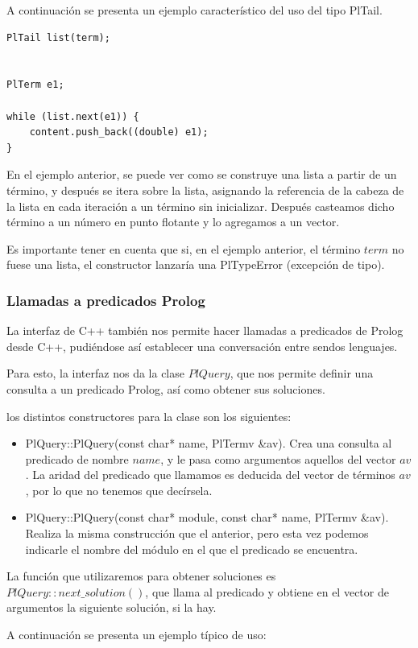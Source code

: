 \documentclass[a4paper]{article}
\begin{document}
A continuación se presenta un ejemplo característico del uso del tipo PlTail.

\begin{lstlisting}[style=C++]
PlTail list(term);


PlTerm e1;

while (list.next(e1)) {
	content.push_back((double) e1);
}
\end{lstlisting}

En el ejemplo anterior, se puede ver como se construye una lista a partir de un término, y después se itera sobre la lista, asignando la referencia de la cabeza de la lista en cada iteración a un término sin inicializar. Después casteamos dicho término a un número en punto flotante y lo agregamos a un vector. 

Es importante tener en cuenta que si, en el ejemplo anterior, el término $term$ no fuese una lista, el constructor lanzaría una PlTypeError (excepción de tipo).
\subsubsection{Llamadas a predicados Prolog}

La interfaz de C++ también nos permite hacer llamadas a predicados de Prolog desde C++, pudiéndose así establecer una conversación entre sendos lenguajes.

Para esto, la interfaz nos da la clase $PlQuery$, que nos permite definir una consulta a un predicado Prolog, así como obtener sus soluciones.

los distintos constructores para la clase son los siguientes:
\begin{itemize}
\item PlQuery::PlQuery(const char* name, PlTermv \&av). Crea una consulta al predicado de nombre $name$, y le pasa como argumentos aquellos del vector $av$. La aridad del predicado que llamamos es deducida del vector de términos $av$, por lo que no tenemos que decírsela.
\item PlQuery::PlQuery(const char* module, const char* name, PlTermv \&av). Realiza la misma construcción que el anterior, pero esta vez podemos indicarle el nombre del módulo en el que el predicado se encuentra.
\end{itemize}

La función que utilizaremos para obtener soluciones es $PlQuery::next\_solution()$, que llama al predicado y obtiene en el vector de argumentos la siguiente solución, si la hay.

A continuación se presenta un ejemplo típico de uso:
\end{document}

